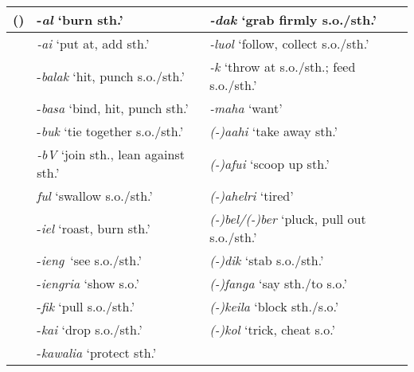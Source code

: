 \begin{flushleft}
\tablehead{}
\begin{supertabular}{|m{0.6011598in}|m{2.7900598in}|m{2.79136in}|}
\hline
\label{bkm:Ref372878878}() &
{}-\textit{al} {\textquoteleft}burn sth.{\textquoteright} &
\textit{{}-dak} {\textquoteleft}grab firmly s.o./sth.{\textquoteright}\\\hline
 &
\textit{{}-ai }{\textquoteleft}put at, add sth.{\textquoteright} &
\textit{{}-luol} {\textquoteleft}follow, collect s.o./sth.{\textquoteright}\\\hline
 &
{}-\textit{balak} {\textquoteleft}hit, punch s.o./sth.{\textquoteright} &
\textit{{}-k} {\textquoteleft}throw at s.o./sth.; feed s.o./sth.{\textquoteright}\\\hline
 &
{}-\textit{basa} {\textquoteleft}bind, hit, punch sth.{\textquoteright} &
\textit{{}-maha} {\textquoteleft}want{\textquoteright}\\\hline
 &
{}-\textit{buk} {\textquoteleft}tie together s.o./sth.{\textquoteright} &
\textit{(-)}\textit{aahi} {\textquoteleft}take away sth.{\textquoteright}\\\hline
 &
\textit{{}-bV} {\textquoteleft}join sth., lean against sth.{\textquoteright} &
\textit{(-)}\textit{afui} {\textquoteleft}scoop up sth.{\textquoteright}\\\hline
 &
\textit{ful} {\textquoteleft}swallow s.o./sth.{\textquoteright} &
\textit{(-)}\textit{ahelri} {\textquoteleft}tired{\textquoteright}\\\hline
 &
{}-\textit{iel} {\textquoteleft}roast, burn sth.{\textquoteright} &
\textit{(-)}\textit{bel/}\textit{(-)}\textit{ber} {\textquoteleft}pluck, pull out s.o./sth.{\textquoteright}\\\hline
 &
{}-\textit{ieng}~{\textquoteleft}see s.o./sth.{\textquoteright} &
\textit{(-)}\textit{dik} {\textquoteleft}stab s.o./sth.{\textquoteright}\\\hline
 &
{}-\textit{iengria} {\textquoteleft}show s.o.{\textquoteright} &
\textit{(-)}\textit{fanga} {\textquoteleft}say sth./to s.o.{\textquoteright}\\\hline
 &
{}-\textit{fik} {\textquoteleft}pull s.o./sth.{\textquoteright} &
\textit{(-)}\textit{keila} {\textquoteleft}block sth./s.o.{\textquoteright}\\\hline
 &
{}-\textit{kai} {\textquoteleft}drop s.o./sth.{\textquoteright} &
\textit{(-)}\textit{kol} {\textquoteleft}trick, cheat s.o.{\textquoteright}\\\hline
 &
{}-\textit{kawalia} {\textquoteleft}protect sth.{\textquoteright} &

\end{supertabular}
\end{flushleft}
